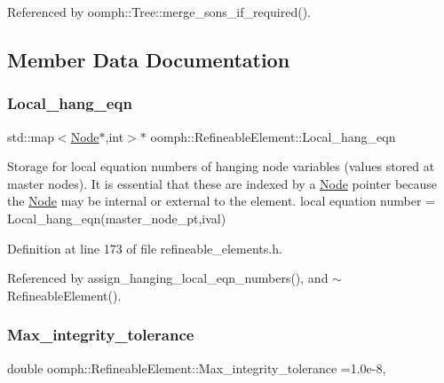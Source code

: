 Referenced by oomph\+::\+Tree\+::merge\+\_\+sons\+\_\+if\+\_\+required().



\subsection{Member Data Documentation}
\mbox{\label{classoomph_1_1RefineableElement_aab6539936853edb8adbdf4ef0f4fd04e}} 
\subsubsection{\texorpdfstring{Local\+\_\+hang\+\_\+eqn}{Local\_hang\_eqn}}
{\footnotesize\ttfamily std\+::map$<$\hyperlink{classoomph_1_1Node}{Node}$\ast$,int$>$$\ast$ oomph\+::\+Refineable\+Element\+::\+Local\+\_\+hang\+\_\+eqn\hspace{0.3cm}{\ttfamily [private]}}



Storage for local equation numbers of hanging node variables (values stored at master nodes). It is essential that these are indexed by a \hyperlink{classoomph_1_1Node}{Node} pointer because the \hyperlink{classoomph_1_1Node}{Node} may be internal or external to the element. local equation number = Local\+\_\+hang\+\_\+eqn(master\+\_\+node\+\_\+pt,ival) 



Definition at line 173 of file refineable\+\_\+elements.\+h.



Referenced by assign\+\_\+hanging\+\_\+local\+\_\+eqn\+\_\+numbers(), and $\sim$\+Refineable\+Element().

\mbox{\label{classoomph_1_1RefineableElement_a24e8e8cbfd68f967386888f927d5432b}} 
\subsubsection{\texorpdfstring{Max\+\_\+integrity\+\_\+tolerance}{Max\_integrity\_tolerance}}
{\footnotesize\ttfamily double oomph\+::\+Refineable\+Element\+::\+Max\+\_\+integrity\+\_\+tolerance =1.\+0e-\/8\hspace{0.3cm}{\ttfamily [static]}, {\ttfamily [protected]}}



